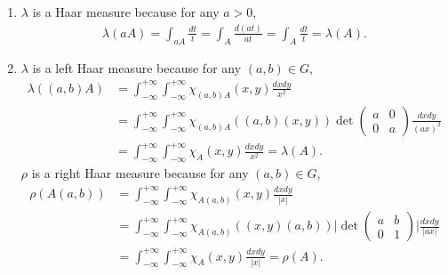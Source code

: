 \begin{enumerate}
\item[1.2.5.]
   $\lambda$ is a Haar measure because for any $a>0$,
   \begin{equation*}\begin{aligned}
   \lambda(aA)=\int_{aA}\frac{dt}{t}=\int_{A}\frac{d(at)}{at}
   =\int_{A}\frac{dt}{t}=\lambda(A).
   \end{aligned}\end{equation*}

\item[1.2.6.]
   $\lambda$ is a left Haar measure because for any $(a,b)\in G$,
   \begin{equation*}\begin{aligned}
   \lambda((a,b)A)
   &=\int_{-\infty}^{+\infty}\int_{-\infty}^{+\infty}\chi_{(a,b)A}(x,y)\frac{dxdy}{x^{2}}\\
   &=\int_{-\infty}^{+\infty}\int_{-\infty}^{+\infty}\chi_{(a,b)A}((a,b)(x,y))
   \det\begin{pmatrix}a & 0 \\ 0 & a\end{pmatrix}\frac{dxdy}{(ax)^{2}}\\
   &=\int_{-\infty}^{+\infty}\int_{-\infty}^{+\infty}\chi_{A}(x,y)\frac{dxdy}{x^{2}}=\lambda(A).
   \end{aligned}\end{equation*}
   $\rho$ is a right Haar measure because for any $(a,b)\in G$,
   \begin{equation*}\begin{aligned}
   \rho(A(a,b))
   &=\int_{-\infty}^{+\infty}\int_{-\infty}^{+\infty}\chi_{A(a,b)}(x,y)\frac{dxdy}{|x|}\\
   &=\int_{-\infty}^{+\infty}\int_{-\infty}^{+\infty}\chi_{A(a,b)}((x,y)(a,b))\bigg|
   \det\begin{pmatrix}a & b \\ 0 & 1\end{pmatrix}\bigg|\frac{dxdy}{|ax|}\\
   &=\int_{-\infty}^{+\infty}\int_{-\infty}^{+\infty}\chi_{A}(x,y)\frac{dxdy}{|x|}=\rho(A).
   \end{aligned}\end{equation*}


\end{enumerate}
